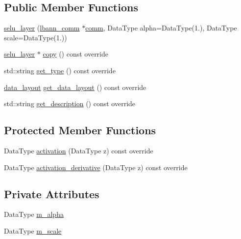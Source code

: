 \subsection*{Public Member Functions}
\begin{DoxyCompactItemize}
\item 
\hyperlink{classlbann_1_1selu__layer_ad71a99f25ddf2c07bc082a8e08f12cc2}{selu\+\_\+layer} (\hyperlink{classlbann_1_1lbann__comm}{lbann\+\_\+comm} $\ast$\hyperlink{file__io_8cpp_ab048c6f9fcbcfaa57ce68b00263dbebe}{comm}, Data\+Type alpha=Data\+Type(1.), Data\+Type scale=Data\+Type(1.))
\item 
\hyperlink{classlbann_1_1selu__layer}{selu\+\_\+layer} $\ast$ \hyperlink{classlbann_1_1selu__layer_a93b696880571fad03f9aa142153117fa}{copy} () const override
\item 
std\+::string \hyperlink{classlbann_1_1selu__layer_a5c1cec500adb135bac681610d53dee79}{get\+\_\+type} () const override
\item 
\hyperlink{base_8hpp_a786677cbfb3f5677b4d84f3056eb08db}{data\+\_\+layout} \hyperlink{classlbann_1_1selu__layer_a02a03e8f426406619e48258f71feffd1}{get\+\_\+data\+\_\+layout} () const override
\item 
std\+::string \hyperlink{classlbann_1_1selu__layer_a58e12f4297b2563718417d4acadea010}{get\+\_\+description} () const override
\end{DoxyCompactItemize}
\subsection*{Protected Member Functions}
\begin{DoxyCompactItemize}
\item 
Data\+Type \hyperlink{classlbann_1_1selu__layer_a266c894e3e1ed4028c1acfe671773524}{activation} (Data\+Type z) const override
\item 
Data\+Type \hyperlink{classlbann_1_1selu__layer_ac5500795e66343c0c8968c24683b79f0}{activation\+\_\+derivative} (Data\+Type z) const override
\end{DoxyCompactItemize}
\subsection*{Private Attributes}
\begin{DoxyCompactItemize}
\item 
Data\+Type \hyperlink{classlbann_1_1selu__layer_a72b22e92f3e70f6b996329e5b170554e}{m\+\_\+alpha}
\item 
Data\+Type \hyperlink{classlbann_1_1selu__layer_a9575be8104b1b24232a2d167405e693a}{m\+\_\+scale}
\end{DoxyCompactItemize}
